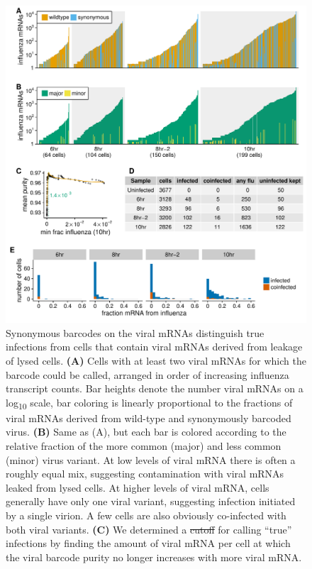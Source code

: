 \documentclass[9pt,lineno]{elife}
\providecommand{\DIFadd}[1]{{\protect\color{blue}\uwave{#1}}} %
\providecommand{\DIFdel}[1]{{\protect\color{red}\sout{#1}}}                      %
\providecommand{\DIFaddFL}[1]{\DIFadd{#1}} %
\providecommand{\DIFdelFL}[1]{\DIFdel{#1}} %
\providecommand{\DIFaddbeginFL}{} %
\providecommand{\DIFaddendFL}{} %
\providecommand{\DIFdelbeginFL}{} %
\providecommand{\DIFdelendFL}{} %
\begin{document}
\begin{figure}[t!]
\DIFdelbeginFL %
\DIFdelendFL \DIFaddbeginFL \centerline{\includegraphics[width=0.82\linewidth]{figures/p_frac_flu_summary.pdf}}
\DIFaddendFL \caption{\label{fig:viralbarcodes}
Synonymous barcodes on the viral mRNAs distinguish true infections from cells that contain viral mRNAs derived from leakage of lysed cells.
{\bf (A)}
Cells with at least two viral mRNAs for which the barcode could be called, arranged in order of increasing influenza transcript counts.
Bar heights denote the number viral mRNAs on a log\textsubscript{10} scale, bar coloring is linearly proportional to the fractions of viral mRNAs derived from wild-type and synonymously barcoded virus.
{\bf (B)}
Same as (A), but each bar is colored according to the relative fraction of the more common (major) and less common (minor) virus variant.
At low levels of viral mRNA there is often a roughly equal mix, suggesting contamination with viral mRNAs leaked from lysed cells.
At higher levels of viral mRNA, cells generally have only one viral variant, suggesting infection initiated by a single virion.
A few cells are also obviously co-infected with both viral variants.
{\bf (C)}
We determined a \DIFdelbeginFL \DIFdelFL{cutoff }\DIFdelendFL \DIFaddbeginFL \DIFaddFL{threshold }\DIFaddendFL for calling ``true'' infections by finding the amount of viral mRNA per cell at which the viral barcode purity no longer increases with more viral mRNA.
}
\end{figure}
\end{document}
